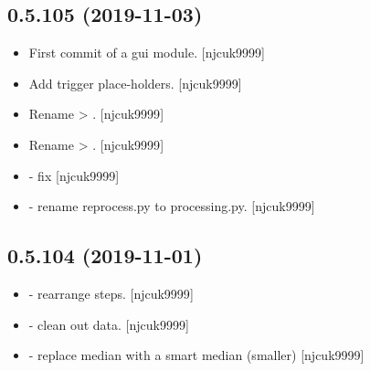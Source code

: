 \documentclass[a4paper,10pt,english]{report}
\begin{document}
\subsection{0.5.105 (2019-11-03)}
\label{\detokenize{misc/changelog:id38}}\begin{itemize}
\item {} 
First commit of a gui module. {[}njcuk9999{]}

\item {} 
Add trigger place-holders. {[}njcuk9999{]}

\item {} 
Rename  \textendash{}\textgreater{} . {[}njcuk9999{]}

\item {} 
Rename  \textendash{}\textgreater{} . {[}njcuk9999{]}

\item {} 
 - fix  {[}njcuk9999{]}

\item {} 
 - rename reprocess.py
to processing.py. {[}njcuk9999{]}

\end{itemize}


\subsection{0.5.104 (2019-11-01)}
\label{\detokenize{misc/changelog:id39}}\begin{itemize}
\item {} 
 - rearrange steps. {[}njcuk9999{]}

\item {} 
 - clean out data. {[}njcuk9999{]}

\item {} 
 - replace median with a smart median (smaller)
{[}njcuk9999{]}

\end{itemize}
\end{document}
